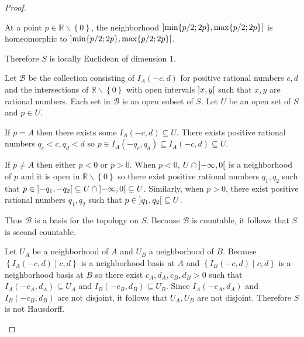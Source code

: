 \begin{proof}
\begin{enumerate}[label={(\alph*)}]
              At a point \( p \in \mathbb{R} \smallsetminus \left\{0\right\} \), the neighborhood \( \left\rbrack{\min\{ p/2; 2p \}, \max\{ p/2; 2p \}}\right\lbrack \) is homeomorphic to \( \left\rbrack{\min\{ p/2; 2p \}, \max\{ p/2; 2p \}}\right\lbrack \).

              Therefore \( S \) is locally Euclidean of dimension \(1\).

              Let \( \mathscr{B} \) be the collection consisting of \( I_{A}(-c, d) \) for positive rational numbers \( c, d \) and the intersections of \( \mathbb{R} \smallsetminus \left\{0\right\} \) with open intervals \( \left\rbrack{x, y}\right\lbrack \) such that \( x, y \) are rational numbers. Each set in \( \mathscr{B} \) is an open subset of \( S \). Let \( U \) be an open set of \( S \) and \( p \in U \).

              If \( p = A \) then there exists some \( I_{A}(-c, d) \subseteq U \). There exists positive rational numbers \( q_{c} < c, q_{d} < d \) so \( p \in I_{A}(-q_{c}, q_{d}) \subseteq I_{A}(-c, d) \subseteq U \).

              If \( p \ne A \) then either \( p < 0 \) or \( p > 0 \). When \( p < 0 \), \( U \cap \left\rbrack{-\infty, 0}\right\lbrack \) is a neighborhood of \( p \) and it is open in \( \mathbb{R}\smallsetminus\left\{0\right\} \) so there exist positive rational numbers \( q_{1}, q_{2} \) such that \( p \in \left\rbrack{-q_{1}, -q_{2}}\right\lbrack \subseteq U \cap \left\rbrack{-\infty, 0}\right\lbrack \subseteq U \). Similarly, when \( p > 0 \), there exist positive rational numbers \( q_{1}, q_{2} \) such that \( p \in \left\rbrack{q_{1}, q_{2}}\right\lbrack \subseteq U \).

              Thus \( \mathscr{B} \) is a basis for the topology on \( S \). Because \( \mathscr{B} \) is countable, it follows that \( S \) is second countable.

              Let \( U_{A} \) be a neighborhood of \( A \) and \( U_{B} \) a neighborhood of \( B \). Because \( \left\{ I_{A}(-c, d) \mid c, d \right\} \) is a neighborhood basis at \( A \) and \( \left\{ I_{B}(-c, d) \mid c, d \right\} \) is a neighborhood basis at \( B \) so there exist \( c_{A}, d_{A}, c_{B}, d_{B} > 0 \) such that \( I_{A}(-c_{A}, d_{A}) \subseteq U_{A} \) and \( I_{B}(-c_{B}, d_{B}) \subseteq U_{B} \). Since \( I_{A}(-c_{A}, d_{A}) \) and \( I_{B}(-c_{B}, d_{B}) \) are not disjoint, it follows that \( U_{A}, U_{B} \) are not disjoint. Therefore \( S \) is not Hausdorff.
    \end{enumerate}
\end{proof}

